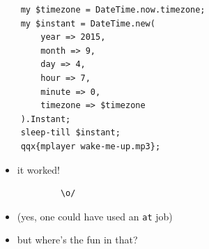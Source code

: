\documentclass[c]{beamer}
\begin{document}
\begin{frame}[fragile]
    \vfill
    \begin{verbatim}
    my $timezone = DateTime.now.timezone;
    my $instant = DateTime.new(
        year => 2015,
        month => 9,
        day => 4,
        hour => 7,
        minute => 0,
        timezone => $timezone
    ).Instant;
    sleep-till $instant;
    qqx{mplayer wake-me-up.mp3};
    \end{verbatim}
\end{frame}

\begin{frame}[fragile]
    \begin{itemize}
        \item it worked!
    \end{itemize}
    \huge
    \begin{verbatim}
            \o/
    \end{verbatim}
\end{frame}

\begin{frame}
    \begin{itemize}
        \item (yes, one could have used an \texttt{at} job)
        \item but where's the fun in that?
    \end{itemize}
\end{frame}

\begin{frame}
    \vfill
\end{frame}

\begin{frame}
\end{frame}

\begin{frame}
\end{frame}

\begin{frame}
\end{frame}
\end{document}
